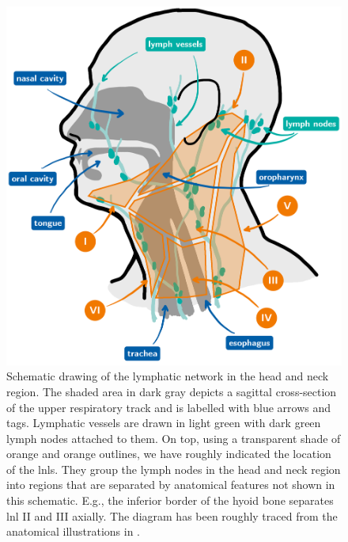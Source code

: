 \documentclass[\relativeRoot/main.tex]{subfiles}
\begin{document}
\begin{figure}
    \centering
    \includegraphics[width=\textwidth]{figures/head_and_neck_labelled.png}
    \caption[
        Schematic drawing of the head and neck region.
    ]{
        Schematic drawing of the lymphatic network in the head and neck region. The shaded area in dark gray depicts a sagittal cross-section of the upper respiratory track and is labelled with blue arrows and tags. Lymphatic vessels are drawn in light green with dark green lymph nodes attached to them. On top, using a transparent shade of orange and orange outlines, we have roughly indicated the location of the \glspl{lnl}. They group the lymph nodes in the head and neck region into regions that are separated by anatomical features not shown in this schematic. E.g., the inferior border of the hyoid bone separates \gls{lnl} II and III axially. The diagram has been roughly traced from the anatomical illustrations in .
    }
    \label{fig:intro:schematics_head}
\end{figure}
\end{document}
